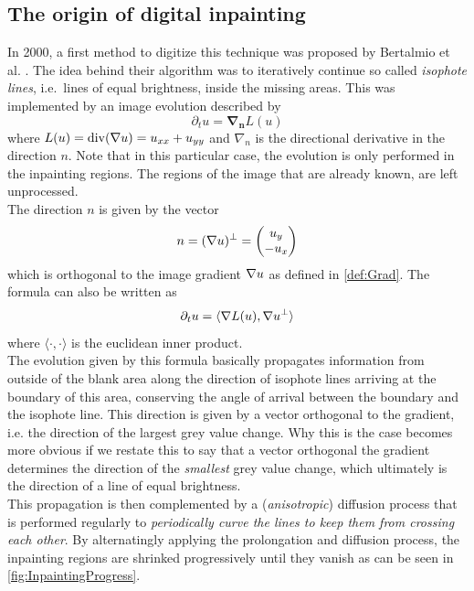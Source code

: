 \subsection{The origin of digital inpainting}
In 2000, a first method to digitize this technique was proposed by Bertalmio et al.
\cite{bertalmio00}. The idea behind their algorithm was to iteratively continue so called \textit{isophote
lines}, i.e.\ lines of equal brightness, inside the missing areas. 
This was implemented by an image evolution described by 
\begin{equation}
    \partial_t u = \mathbf{\nabla_n} L(u)  
\end{equation}
where $L(u) = \operatorname{div}(\mathbf{\nabla}  u) = u_{xx} + u_{yy}$ and $\nabla_n$ is the 
directional derivative in the direction $n$. Note that in this particular case, the evolution is
only performed in the inpainting regions. The regions of the image that are already known, are left
unprocessed. \\
The direction $n$ is given by the vector
\begin{equation}
    n = (\mathbf{\nabla}  u)^\bot = \begin{pmatrix}
        u_y\\-u_x
    \end{pmatrix}
\end{equation}
which is orthogonal to the image gradient $\mathbf{\nabla} u$ as defined in \ref{def:Grad}.
The formula can also be written as 
\begin{equation}
    \partial_t u = \langle \mathbf{\nabla} L(u), \mathbf{\nabla} u^\bot\rangle
\end{equation}
where $\langle\cdot,\cdot\rangle$ is the euclidean inner product.\\
The evolution given by this formula basically propagates information from outside of the blank
area along the direction of isophote lines arriving at the boundary of this area, conserving the
angle of arrival between the boundary and the isophote line.\cite{bertalmio00}
This direction is given by a vector orthogonal to the gradient, i.e. the direction of the largest
grey value change.
Why this is the case becomes more obvious if we restate this to say that a vector orthogonal the gradient
determines the direction of the \textit{smallest} grey value change, which ultimately is the
direction of a line of equal brightness.\\
This propagation is then complemented by a (\textit{anisotropic}) diffusion process that is performed regularly to
\textit{periodically curve the lines to keep them from crossing each other}\cite{bertalmio00}.
By alternatingly applying the prolongation and diffusion process, the inpainting regions are
shrinked progressively until they vanish as can be seen in \ref{fig:InpaintingProgress}.

